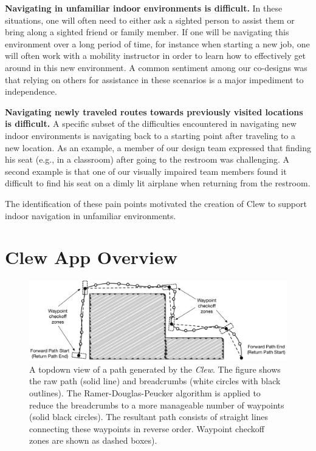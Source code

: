 \documentclass[chi_draft]{sigchi}
\begin{document}
\textbf{Navigating in unfamiliar indoor environments is difficult.} In these situations, one will often need to either ask a sighted person to assist them or bring along a sighted friend or family member.  If one will be navigating this environment over a long period of time, for instance when starting a new job, one will often work with a mobility instructor in order to learn how to effectively get around in this new environment.  A common sentiment among our co-designs was that relying on others for assistance in these scenarios is a major impediment to independence.

\textbf{Navigating newly traveled routes towards previously visited locations is difficult.} A specific subset of the difficulties encountered in navigating new indoor environments is navigating back to a starting point after traveling to a new location.  As an example, a member of our design team expressed that finding his seat (e.g., in a classroom) after going to the restroom was challenging.  A second example is that one of our visually impaired team members found it difficult to find his seat on a dimly lit airplane when returning from the restroom.

The identification of these pain points motivated the creation of Clew to support indoor navigation in unfamiliar environments.%

\section{Clew App Overview}\label{sec:clewoverview}

\begin{figure}
\begin{center}
\includegraphics[width=\linewidth]{Figures/samplepath}
\end{center}
\caption{A topdown view of a path generated by the \emph{Clew}.  The figure shows the raw path (solid line) and breadcrumbs (white circles with black outlines).  The Ramer-Douglas-Peucker algorithm is applied to reduce the breadcrumbs to a more manageable number of waypoints (solid black circles).  The resultant path consists of straight lines connecting these waypoints in reverse order.  Waypoint checkoff zones are shown as dashed boxes).\label{fig:samplepath}}
\end{figure}
\end{document}
